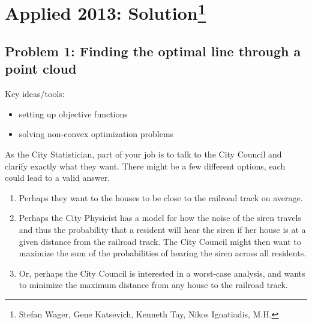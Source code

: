 \section{Applied 2013: Solution\footnote{Stefan Wager, Gene Katsevich, Kenneth Tay, Nikos Ignatiadis, M.H.}}


\subsection*{Problem 1: Finding the optimal line through a point cloud}

Key ideas/tools:
\begin{itemize}
\item setting up objective functions
\item solving non-convex optimization problems
\end{itemize}




As the City Statistician, part of your job is to talk to the City Council and clarify exactly what they want. There might be a few different options, each could lead to a valid answer.

\begin{enumerate}
\item Perhaps they want to the houses to be close to the railroad track on average.

\item Perhaps the City Physicist has a model for how the noise of the siren travels and thus the probability that a resident will hear the siren if her house is at a given distance from the railroad track. The City Council might then want to maximize the sum of the probabilities of hearing the siren across all residents.

\item Or, perhaps the City Council is interested in a worst-case analysis, and wants to minimize the maximum distance from any house to the railroad track.
\end{enumerate}

